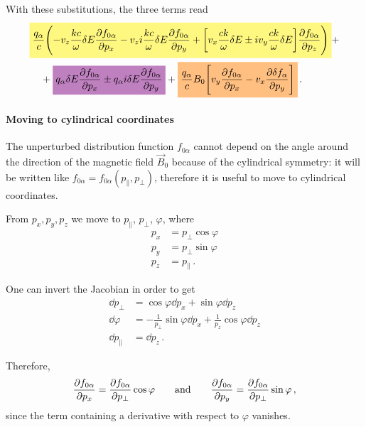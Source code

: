 \documentclass[main.tex]{subfiles}
\begin{document}
With these substitutions, the three terms read
%
\begin{align}
\begin{split}
& \hlc{yellow}{\frac{q_\alpha}{c} \qty( -v_z \frac{kc}{ \omega } \delta E \pdv{f_{0 \alpha }}{p_x}
-  v_z i \frac{kc}{\omega } \delta E
\pdv{f_{0 \alpha }}{p_y} 
+ \qty[v_x \frac{ck}{\omega } \delta E \pm i v_y \frac{ck}{\omega } \delta E] \pdv{f_{0 \alpha }}{p_z})} +
\\
&\phantom{=}\ 
+ \hlc{violet}{q_\alpha \delta E \pdv{ f_{0 \alpha} }{p_x} \pm q_\alpha i \delta E \pdv{f_{0 \alpha }}{p_y}} 
+ \hlc{orange}{\frac{q_\alpha}{c} 
B_0 \qty[v_y \pdv{f_{0 \alpha }}{p_x} - v_x \pdv{ \delta f_\alpha }{p_y}]}
\,.
\end{split}
\end{align}

\paragraph{Moving to cylindrical coordinates}

The unperturbed distribution function \(f_{0 \alpha }\) cannot depend on the angle around the direction of the magnetic field \(\vec{B}_0 \)
because of the cylindrical symmetry: it will be written like \(f_{0 \alpha } = f_{0 \alpha } (p_{\parallel}, p_\perp)\), therefore it is useful to move to cylindrical coordinates. 

From \(p_x, p_y, p_z\) we move to \(p_\parallel\), \(p_\perp\), \(\varphi \), where 
%
\begin{align}
p_x &= p_\perp \cos \varphi \\
p_y &= p_\perp \sin \varphi \\
p_z &= p_\parallel
\,.
\end{align}

One can invert the Jacobian in order to get 
%
\begin{align}
\dd{p_\perp} &= \cos \varphi \dd{p_x} + \sin \varphi \dd{p_z}  \\
\dd{\varphi } &= - \frac{1}{p_\perp} \sin \varphi \dd{p_x} + \frac{1}{p_z} \cos \varphi \dd{p_z}  \\
\dd{p_\parallel} &= \dd{p_z}
\,.
\end{align}

Therefore, 
%
\begin{align}
\pdv{ f_{0 \alpha }}{p_x} = \pdv{ f_{0 \alpha }}{p_\perp} \cos \varphi 
\qquad \text{and} \qquad
\pdv{ f_{0 \alpha }}{p_y} = \pdv{ f_{0 \alpha }}{p_\perp} \sin \varphi 
\,,
\end{align}
%
since the term containing a derivative with respect to \(\varphi \) vanishes. 
\end{document}
